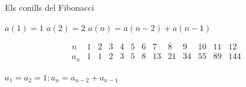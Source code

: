 \documentclass[11pt,catalan,
               listoftables,listoffigures,listofalgorithms,listofquadres]
               {tfgetsinf}
\begin{document}
\lipsum[19]
\begin{algorithm}
   \caption{Els conills del Fibonacci}\label{algorisme:Fibonacci}
\begin{algorithmic}
\STATE $a(1)=1$
\STATE $a(2)=2$
\STATE $a(n)=a(n-2)+a(n-1)$
\ENDWHILE
\end{algorithmic}
\end{algorithm}
\begin{table}[h]
\[
\begin{array}{c|*{12}{c}}
n & 1 & 2 & 3 & 4 & 5 & 6 & 7 & 8 & 9 & 10 & 11 & 12 \\\hline
a_n & 1 & 1 & 2 & 3 & 5 & 8 & 13 & 21 & 34 & 55 & 89 & 144
\end{array}
\]
\caption{$a_1=a_2=1; a_{n}=a_{n-2}+a_{n-1}$}
\end{table}
\lipsum[20]
\lipsum[21]
\end{document}
